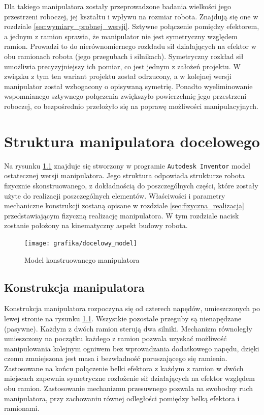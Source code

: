 \documentclass[printmode]{mgr}
\begin{document}
Dla takiego manipulatora zostały przeprowadzone badania wielkości jego przestrzeni roboczej, jej kształtu i wpływu na rozmiar robota.
Znajdują się one w rozdziale \ref{sec:wymiary_probnej_wersji}. 
Sztywne połączenie pomiędzy efektorem, a jednym z ramion sprawia, że manipulator nie jest symetryczny względem ramion. 
Prowadzi to do nierównomiernego rozkładu sił działających na efektor w obu ramionach robota (jego przegubach i silnikach).
Symetryczny rozkład sił umożliwia precyzyjniejszy ich pomiar, co jest jednym z założeń projektu. 
W związku z tym ten wariant projektu został odrzucony, a w kolejnej wersji manipulator został wzbogacony o opisywaną symetrię. 
Ponadto wyeliminowanie wspomnianego sztywnego połączenia zwiększyło powierzchnię jego przestrzeni roboczej, co bezpośrednio przełożyło
się na poprawę możliwości manipulacyjnych.


\chapter{Struktura manipulatora docelowego}
Na rysunku \ref{rys:docelowy_model} znajduje się stworzony w programie \texttt{Autodesk Inventor} model
ostatecznej wersji manipulatora. Jego struktura odpowiada strukturze robota fizycznie skonstruowanego, z dokładnością
do poszczególnych części, które zostały użyte do realizacji poszczególnych elementów. Właściwości i parametry mechaniczne
konstrukcji zostaną opisane w rozdziale \ref{sec:fizyczna_realizacja} przedstawiającym fizyczną realizację manipulatora.
W tym rozdziale nacisk zostanie położony na kinematyczny aspekt budowy robota.
\begin{figure}[tp]
\centering
  \texttt{[image: grafika/docelowy\_model]}
  \caption{Model konstruowanego manipulatora}
  \label{rys:docelowy_model}  
\end{figure}

\section{Konstrukcja manipulatora}
Konstrukcja manipulatora rozpoczyna się od czterech napędów, umieszczonych po lewej stronie na rysunku \ref{rys:docelowy_model}.
Wszystkie pozostałe przeguby są nienapędzane (pasywne). Każdym z dwóch ramion sterują dwa silniki. 
Mechanizm równoległy umieszczony na początku każdego z ramion
pozwala uzyskać możliwość manipulowania kolejnym ogniwem bez wprowadzania dodatkowego napędu, dzięki czemu
zmniejszona jest masa i bezwładność poruszającego się ramienia.
Zastosowane na końcu połączenie belki efektora z każdym z ramion w dwóch miejscach zapewnia symetryczne rozłożenie
sił działających na efektor względem obu ramion. Zastosowanie mechanizmu przesuwnego pozwala
na swobodny ruch manipulatora, przy zachowaniu równej odległości pomiędzy belką efektora i ramionami.
\end{document}

